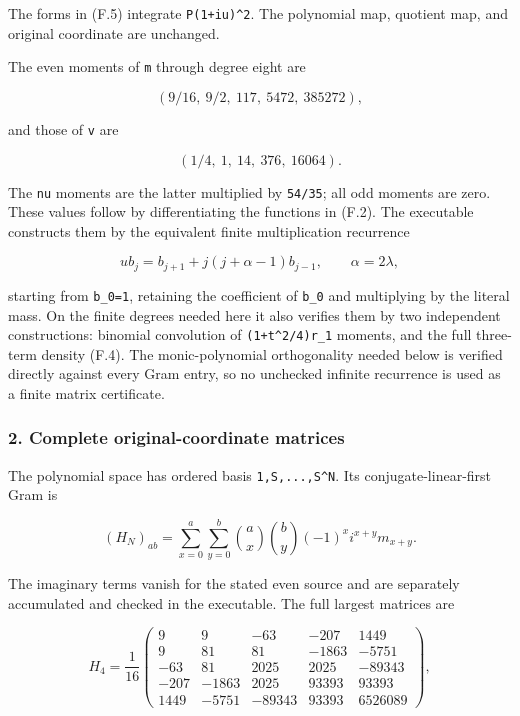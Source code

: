 The forms in (F.5) integrate \texttt{\textbar{}P(1+iu)\textbar{}\^{}2}. The polynomial map, quotient map, and original coordinate are unchanged.

The even moments of \nolinkurl{m} through degree eight are

\[
(9/16,\ 9/2,\ 117,\ 5472,\ 385272),
\]

and those of \nolinkurl{v} are

\[
(1/4,\ 1,\ 14,\ 376,\ 16064).
\tag{F.6}
\]

The \nolinkurl{nu} moments are the latter multiplied by \nolinkurl{54/35}; all odd moments are zero. These values follow by differentiating the functions in (F.2). The executable constructs them by the equivalent finite multiplication recurrence

\[
u b_j=b_{j+1}+j(j+\alpha-1)b_{j-1},
\qquad \alpha=2\lambda,
\]

starting from \nolinkurl{b_0=1}, retaining the coefficient of \nolinkurl{b_0} and multiplying by the literal mass. On the finite degrees needed here it also verifies them by two independent constructions: binomial convolution of \texttt{(1+t\^{}2/4)r\_1} moments, and the full three-term density (F.4). The monic-polynomial orthogonality needed below is verified directly against every Gram entry, so no unchecked infinite recurrence is used as a finite matrix certificate.

\subsubsection{2. Complete original-coordinate matrices}\label{endpoint-restriction_fixture--complete-original-coordinate-matrices}

The polynomial space has ordered basis \texttt{1,S,...,S\^{}N}. Its conjugate-linear-first Gram is

\[
(H_N)_{ab}
=\sum_{x=0}^a\sum_{y=0}^b
 \binom ax\binom by(-1)^x i^{x+y}m_{x+y}.
\tag{F.7}
\]

The imaginary terms vanish for the stated even source and are separately accumulated and checked in the executable. The full largest matrices are

\[
H_4=\frac1{16}
\begin{pmatrix}
9&9&-63&-207&1449\\
9&81&81&-1863&-5751\\
-63&81&2025&2025&-89343\\
-207&-1863&2025&93393&93393\\
1449&-5751&-89343&93393&6526089
\end{pmatrix},
\tag{F.8}
\]

